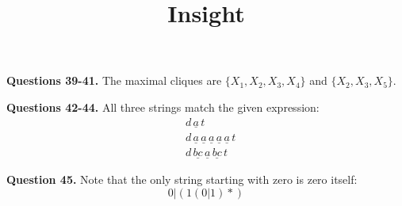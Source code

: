 \documentclass{ximera}
\title{Insight}
\begin{document}
\maketitle

\textbf{Questions 39-41. } The maximal cliques are $\{X_1, X_2, X_3, X_4\}$ and $\{X_2, X_3, X_5\}$.

\textbf{Questions 42-44. }
All three strings match the given expression:
\begin{align*}
&d \, \underline{a} \, t\\
&d \, \underline{a} \, \underline{a} \, \underline{a} \, \underline{a} \, \underline{a} \, t\\
&d \, \underline{bc} \, \underline{a} \, \underline{bc} \, t
\end{align*}

\textbf{Question 45.}
Note that the only string starting with zero is zero itself:
\begin{equation*}
0 | \left(1(0|1)*\right)
\end{equation*}
\end{document}
